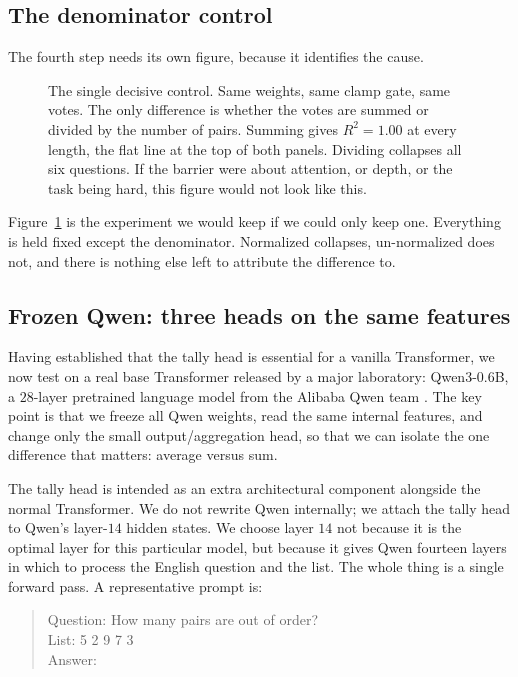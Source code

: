 \documentclass[10pt]{article}
\theoremstyle{definition}
\begin{document}
\subsection{The denominator control}
\label{sec:denom}

The fourth step needs its own figure, because it identifies the cause.

\begin{figure}[htbp]
\centering

\caption{The single decisive control. Same weights, same clamp gate, same
votes. The only difference is whether the votes are summed or divided by
the number of pairs. Summing gives $R^2 = 1.00$ at every length, the flat
line at the top of both panels. Dividing collapses all six questions. If
the barrier were about attention, or depth, or the task being hard, this
figure would not look like this.}
\label{fig:denominator}
\end{figure}

Figure~\ref{fig:denominator} is the experiment we would keep if we could
only keep one. Everything is held fixed except the denominator. Normalized
collapses, un-normalized does not, and there is nothing else left to
attribute the difference to.

\subsection{Frozen Qwen: three heads on the same features}
\label{sec:qwen-setup}

Having established that the tally head is essential for a vanilla
Transformer, we now test on a real base Transformer released by a major
laboratory: Qwen3-0.6B, a $28$-layer pretrained language model from the
Alibaba Qwen team \citep{qwen3}. The key point is that we freeze all Qwen weights, read
the same internal features, and change only the small output/aggregation
head, so that we can isolate the one difference that matters: average
versus sum.

The tally head is intended as an extra architectural component alongside
the normal Transformer. We do not rewrite Qwen internally; we attach the
tally head to Qwen's layer-$14$ hidden states. We choose layer $14$ not
because it is the optimal layer for this particular model, but because it
gives Qwen fourteen layers in which to process the English question and
the list. The whole thing is a single forward pass. A representative
prompt is:

\begin{quote}
\ttfamily
Question: How many pairs are out of order?\\
List: 5 2 9 7 3\\
Answer:
\end{quote}
\end{document}
